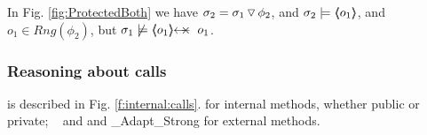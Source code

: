 \begin{example}  
\label{push:does:not:imply}   
In  Fig. \ref{fig:ProtectedBoth} we have
 $\sigma_2= \PushSLong {\phi_2} {\sigma_1}$, and    $\sigma_2 \models \inside{o_1}$,  and $o_1\!\in \!Rng(\phi_2)$,
 but $\sigma_1 \not\models \protectedFrom {o_1} {o_1}$. %
%
% 
\end{example}






\subsubsection{Reasoning about   calls}
\label{s:calls}
is described in Fig. \ref{f:internal:calls}. {}  %
 for internal methods, whether public or private; \ %
and {} and {\_Adapt\_Strong} for  external methods.




